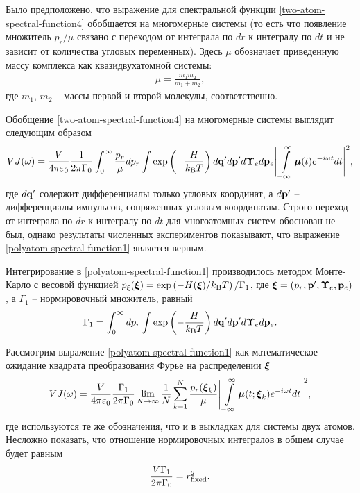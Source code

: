 Было предположено, что выражение для спектральной функции \eqref{two-atom-spectral-function4} обобщается на многомерные системы (то есть что появление множитель $p_r/ \mu$ связано с переходом от интеграла по $dr$ к интегралу по $dt$ и не зависит от количества угловых переменных). Здесь $\mu$ обозначает приведенную массу комплекса как квазидвухатомной системы:
\begin{gather}
    \mu = \frac{m_1 m_2}{m_1 + m_2},
\end{gather}
%
где $m_1$, $m_2$ -- массы первой и второй молекулы, соответственно. \par
Обобщение \eqref{two-atom-spectral-function4} на многомерные системы выглядит следующим образом
\begin{gather}
    V J(\omega) =  \frac{V}{4 \pi \varepsilon_0} \frac{1}{2\pi \Gamma_0}\int_0^\infty \frac{p_r}{\mu} dp_r \int \exp \left( -\frac{H}{k_\text{B} T} \right) d\mathbf{q}^\prime d\mathbf{p}^\prime d\boldsymbol{\Upsilon}_e d\mathbf{p}_e \Bigg\vert \int\limits_{-\infty}^\infty \boldsymbol{\mu}(t) e^{-i \omega t} dt \Bigg\vert^2, \label{polyatom-spectral-function1} 
\end{gather}
%
где $d\mathbf{q}^\prime$ содержит дифференциалы только угловых координат, а $d\mathbf{p}^\prime$ -- дифференциалы импульсов, сопряженных угловым координатам. Строго переход от интеграла по $dr$ к интегралу по $dt$ для многоатомных систем обоснован не был, однако результаты численных экспериментов показывают, что выражение \eqref{polyatom-spectral-function1} является верным. \par
Интегрирование в \eqref{polyatom-spectral-function1} производилось методом Монте-Карло с весовой функцией $p_\xi(\boldsymbol{\xi}) = \exp \left( - H(\boldsymbol{\xi})/k_\text{B} T \right) / \Gamma_1$, где $\boldsymbol{\xi} = \left( p_r, \mathbf{p}^\prime, \boldsymbol{\Upsilon}_e, \mathbf{p}_e \right)$, а $\Gamma_1$ -- нормировочный множитель, равный
\begin{gather}
    \Gamma_1 = \int_0^\infty dp_r \int \exp \left( -\frac{H}{k_\text{B} T} \right) d\mathbf{q}^\prime d\mathbf{p}^\prime d\boldsymbol{\Upsilon}_e d\mathbf{p}_e.
\end{gather}

Рассмотрим выражение \eqref{polyatom-spectral-function1} как математическое ожидание квадрата преобразования Фурье на распределении $\boldsymbol{\xi}$
\begin{gather}
    VJ(\omega) = \frac{V}{4 \pi \varepsilon_0} \frac{\Gamma_1}{2 \pi \Gamma_0} \lim_{N \rightarrow \infty} \frac{1}{N} \sum_{k = 1}^N \frac{p_r(\boldsymbol{\xi}_k)}{\mu} \Bigg\vert \int\limits_{-\infty}^\infty \boldsymbol{\mu}(t; \boldsymbol{\xi}_k) e^{-i \omega t} dt \Bigg\vert^2,
\end{gather}
%
где используются те же обозначения, что и в выкладках для системы двух атомов. Несложно показать, что отношение нормировочных интегралов в общем случае будет равным
\begin{gather}
    \frac{V \Gamma_1}{2 \pi \Gamma_0} = r_\text{fixed}^2.
\end{gather}

